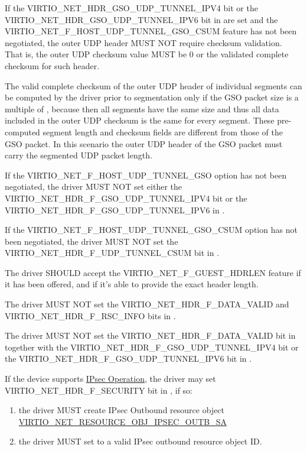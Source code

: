 If the VIRTIO_NET_HDR_GSO_UDP_TUNNEL_IPV4 bit or the
VIRTIO_NET_HDR_GSO_UDP_TUNNEL_IPV6 bit in  are set
and the VIRTIO_NET_F_HOST_UDP_TUNNEL_GSO_CSUM feature has not
been negotiated, the
outer UDP header MUST NOT require checksum validation. That is, the
outer UDP checksum value MUST be 0 or the validated complete checksum
for such header.

\begin{note}
The valid complete checksum of the outer UDP header of individual segments
can be computed by the driver prior to segmentation only if the GSO packet
size is a multiple of , because then all segments
have the same size and thus all data included in the outer UDP
checksum is the same for every segment. These pre-computed segment
length and checksum fields are different from those of the GSO
packet.
In this scenario the outer UDP header of the GSO packet must carry the
segmented UDP packet length.
\end{note}

If the VIRTIO_NET_F_HOST_UDP_TUNNEL_GSO option has not
been negotiated, the driver MUST NOT set either the VIRTIO_NET_HDR_F_GSO_UDP_TUNNEL_IPV4
bit or the VIRTIO_NET_HDR_F_GSO_UDP_TUNNEL_IPV6 in .

If the VIRTIO_NET_F_HOST_UDP_TUNNEL_GSO_CSUM option has not been negotiated,
the driver MUST NOT set the VIRTIO_NET_HDR_F_UDP_TUNNEL_CSUM bit
in .

The driver SHOULD accept the VIRTIO_NET_F_GUEST_HDRLEN feature if it has
been offered, and if it's able to provide the exact header length.

The driver MUST NOT set the VIRTIO_NET_HDR_F_DATA_VALID and
VIRTIO_NET_HDR_F_RSC_INFO bits in .

The driver MUST NOT set the VIRTIO_NET_HDR_F_DATA_VALID bit in 
together with the VIRTIO_NET_HDR_F_GSO_UDP_TUNNEL_IPV4 bit or the
VIRTIO_NET_HDR_F_GSO_UDP_TUNNEL_IPV6 bit in .

If the device supports \hyperref[sec:Device Types / Network Device / Device Operation / IPsec Operation]{IPsec Operation},
the driver may set VIRTIO_NET_HDR_F_SECURITY bit in , if so:
\begin{enumerate}
\item the driver MUST create IPsec Outbound resource object
\hyperref[par:Device Types / Crypto Device / Device Operation / IPsec Service Operation / Resource objects / VIRTIO-CRYPTO-RESOURCE-OBJ-IPSEC-OUTBOUND-SA]{VIRTIO_NET_RESOURCE_OBJ_IPSEC_OUTB_SA}
\item the driver MUST set  to a valid IPsec outbound
      resource object ID.
\end{enumerate}

